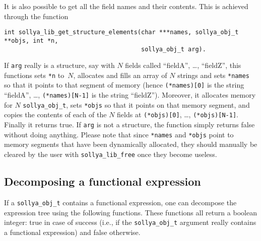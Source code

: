 \documentclass[a4paper]{article}
\begin{document}
It is also possible to get all the field names and their contents. This is achieved through the function
\begin{center}
\verb|int sollya_lib_get_structure_elements(char ***names, sollya_obj_t **objs, int *n,|\\
\verb|                                      sollya_obj_t arg).                          |
\end{center}
If \verb|arg| really is a structure, say with $N$ fields called ``fieldA'', \dots, ``fieldZ'', this functions sets \verb|*n| to~$N$, allocates and fills an array of $N$ strings and sets \verb|*names| so that it points to that segment of memory (hence \verb|(*names)[0]| is the string ``fieldA'', \dots, \verb|(*names)[N-1]| is the string ``fieldZ''). Moreover, it allocates memory for $N$ \verb|sollya_obj_t|, sets \verb|*objs| so that it points on that memory segment, and copies the contents of each of the $N$ fields at \verb|(*objs)[0]|, \dots, \verb|(*objs)[N-1]|. Finally it returns true. If \verb|arg| is not a structure, the function simply returns false without doing anything. Please note that since \verb|*names| and \verb|*objs| point to memory segments that have been dynamically allocated, they should manually be cleared by the user with \verb|sollya_lib_free| once they become useless.

\subsection{Decomposing a functional expression}
If a \texttt{sollya\_obj\_t} contains a functional expression, one can decompose the expression tree using the following functions. These functions all return a boolean integer: true in case of success (i.e., if the \texttt{sollya\_obj\_t} argument really contains a functional expression) and false otherwise.
\end{document}
